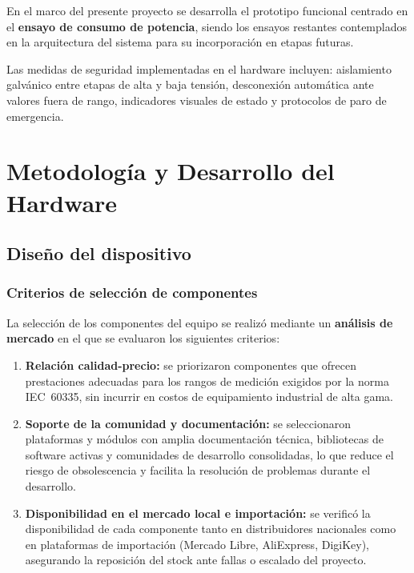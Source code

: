 En el marco del presente proyecto se desarrolla el prototipo funcional
centrado en el \textbf{ensayo de consumo de potencia}, siendo los ensayos
restantes contemplados en la arquitectura del sistema para su incorporación
en etapas futuras.

Las medidas de seguridad implementadas en el hardware incluyen:
aislamiento galvánico entre etapas de alta y baja tensión,
desconexión automática ante valores fuera de rango,
indicadores visuales de estado y protocolos de paro de emergencia.

\section{Metodología y Desarrollo del Hardware}
\label{sec:metodologia_hw}

\subsection{Diseño del dispositivo}
\label{subsec:diseno_dispositivo}

\subsubsection{Criterios de selección de componentes}
\label{subsubsec:criterios_seleccion}

La selección de los componentes del equipo se realizó mediante un
\textbf{análisis de mercado} en el que se evaluaron los siguientes criterios:

\begin{enumerate}
    \item \textbf{Relación calidad-precio:} se priorizaron componentes que
          ofrecen prestaciones adecuadas para los rangos de medición exigidos
          por la norma IEC~60335, sin incurrir en costos de equipamiento
          industrial de alta gama.

    \item \textbf{Soporte de la comunidad y documentación:} se seleccionaron
          plataformas y módulos con amplia documentación técnica, bibliotecas
          de software activas y comunidades de desarrollo consolidadas, lo que
          reduce el riesgo de obsolescencia y facilita la resolución de
          problemas durante el desarrollo.

    \item \textbf{Disponibilidad en el mercado local e importación:}
          se verificó la disponibilidad de cada componente tanto en
          distribuidores nacionales como en plataformas de importación
          (Mercado Libre, AliExpress, DigiKey), asegurando la reposición
          del stock ante fallas o escalado del proyecto.
\end{enumerate}

